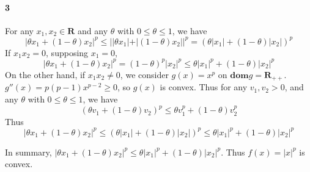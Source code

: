 \documentclass{article}
\begin{document}
\paragraph{3}
For any $x_1, x_2 \in \mathbf{R} $ and any $\theta$ with $0\leq \theta \leq 1$, we have
\[
|\theta x_1 + (1-\theta)x_2|^p \leq ||\theta x_1| + |(1-\theta)x_2||^p = (\theta|x_1| + (1-\theta)|x_2|)^p
\]
If $x_1x_2=0$, supposing $x_1=0$,
\[
|\theta x_1 + (1-\theta)x_2|^p = (1-\theta)^p|x_2|^p \leq \theta |x_1|^p + (1-\theta)|x_2|^p
\]
On the other hand, if $x_1x_2\ne0$, we consider $g(x)=x^p$ on $\mathbf{dom}g=\mathbf{R}_{++}$. $g''(x) = p(p-1)x^{p-2} \ge 0$, so $g(x)$ is convex. Thus for any $v_1, v_2>0$, and any $\theta$ with $0\leq \theta \leq 1$, we have
\[
(\theta v_1 + (1-\theta)v_2)^p \le \theta v_1^p + (1-\theta)v_2^p 
\]
Thus 
\[
|\theta x_1 + (1-\theta)x_2|^p \le (\theta|x_1| + (1-\theta)|x_2|)^p \le \theta |x_1|^p + (1-\theta)|x_2|^p 
\]

In summary, $|\theta x_1 + (1-\theta)x_2|^p \le \theta |x_1|^p + (1-\theta)|x_2|^p $. Thus $f(x) = |x|^p$ is convex.
	
	
	
	
	
	
	
	
	
\end{document}
